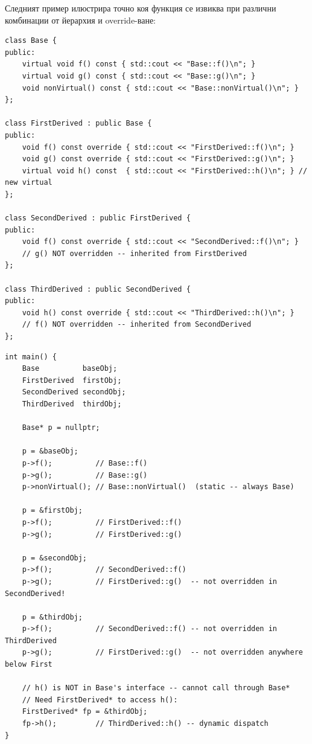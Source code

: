 \documentclass{scrartcl}
\begin{document}
\begin{FlushLeft}
Следният пример илюстрира точно коя функция се извиква при различни комбинации от йерархия и override-ване:

\begin{lstlisting}
class Base {
public:
    virtual void f() const { std::cout << "Base::f()\n"; }
    virtual void g() const { std::cout << "Base::g()\n"; }
    void nonVirtual() const { std::cout << "Base::nonVirtual()\n"; }
};

class FirstDerived : public Base {
public:
    void f() const override { std::cout << "FirstDerived::f()\n"; }
    void g() const override { std::cout << "FirstDerived::g()\n"; }
    virtual void h() const  { std::cout << "FirstDerived::h()\n"; } // new virtual
};

class SecondDerived : public FirstDerived {
public:
    void f() const override { std::cout << "SecondDerived::f()\n"; }
    // g() NOT overridden -- inherited from FirstDerived
};

class ThirdDerived : public SecondDerived {
public:
    void h() const override { std::cout << "ThirdDerived::h()\n"; }
    // f() NOT overridden -- inherited from SecondDerived
};
\end{lstlisting}

\begin{lstlisting}
int main() {
    Base          baseObj;
    FirstDerived  firstObj;
    SecondDerived secondObj;
    ThirdDerived  thirdObj;

    Base* p = nullptr;

    p = &baseObj;
    p->f();          // Base::f()
    p->g();          // Base::g()
    p->nonVirtual(); // Base::nonVirtual()  (static -- always Base)

    p = &firstObj;
    p->f();          // FirstDerived::f()
    p->g();          // FirstDerived::g()

    p = &secondObj;
    p->f();          // SecondDerived::f()
    p->g();          // FirstDerived::g()  -- not overridden in SecondDerived!

    p = &thirdObj;
    p->f();          // SecondDerived::f() -- not overridden in ThirdDerived
    p->g();          // FirstDerived::g()  -- not overridden anywhere below First

    // h() is NOT in Base's interface -- cannot call through Base*
    // Need FirstDerived* to access h():
    FirstDerived* fp = &thirdObj;
    fp->h();         // ThirdDerived::h() -- dynamic dispatch
}
\end{lstlisting}


\end{FlushLeft}
\end{document}
